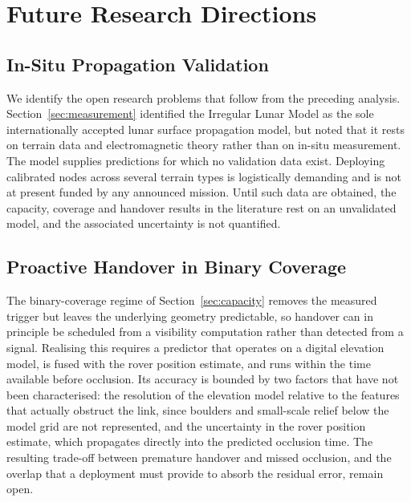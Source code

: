 \documentclass[11pt,a4paper]{article}
\begin{document}
\section{Future Research Directions}
\label{sec:open}

\subsection{In-Situ Propagation Validation}
We identify the open research problems that follow from the preceding analysis. Section~\ref{sec:measurement} identified the Irregular Lunar Model as the sole internationally accepted lunar surface propagation model, but noted that it rests on terrain data and electromagnetic theory rather than on in-situ measurement. The model supplies predictions for which no validation data exist. Deploying calibrated nodes across several terrain types is logistically demanding and is not at present funded by any announced mission. Until such data are obtained, the capacity, coverage and handover results in the literature rest on an unvalidated model, and the associated uncertainty is not quantified.

\subsection{Proactive Handover in Binary Coverage}
The binary-coverage regime of Section~\ref{sec:capacity} removes the measured trigger but leaves the underlying geometry predictable, so handover can in principle be scheduled from a visibility computation rather than detected from a signal. Realising this requires a predictor that operates on a digital elevation model, is fused with the rover position estimate, and runs within the time available before occlusion. Its accuracy is bounded by two factors that have not been characterised: the resolution of the elevation model relative to the features that actually obstruct the link, since boulders and small-scale relief below the model grid are not represented, and the uncertainty in the rover position estimate, which propagates directly into the predicted occlusion time. The resulting trade-off between premature handover and missed occlusion, and the overlap that a deployment must provide to absorb the residual error, remain open.
\end{document}
